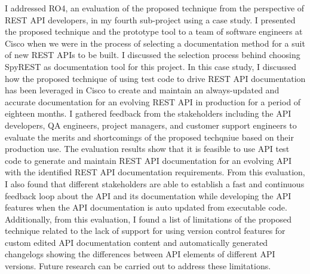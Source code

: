 \documentclass[12pt]{ucalgthes1}
\begin{document}
I addressed RO4, an evaluation of the proposed technique from the perspective of REST API developers, in my fourth sub-project using a case study. I presented the proposed technique and the prototype tool to a team of software engineers at Cisco when we were in the process of selecting a documentation method for a suit of new REST APIs to be built. I discussed the selection process behind choosing SpyREST as documentation tool for this project. In this case study, I discussed how the proposed technique of using test code to drive REST API documentation has been leveraged in Cisco to create and maintain an always-updated and accurate documentation for an evolving REST API in production for a period of eighteen months. I gathered feedback from the stakeholders including the API developers, QA engineers, project managers, and customer support engineers to evaluate the merits and shortcomings of the proposed techqniue based on their production use. The evaluation results show that it is feasible to use API test code to generate and maintain REST API documentation for an evolving API with the identified REST API documentation requirements. From this evaluation, I also found that different stakeholders are able to establish a fast and continuous feedback loop about the API and its documentation while developing the API features when the API documentation is auto updated from executable code. Additionally, from this evaluation, I found a list of limitations of the proposed technique related to the lack of support for using version control features for custom edited API documentation content and automatically generated changelogs showing the differences between API elements of different API versions. Future research can be carried out to address these limitations.
\end{document}
